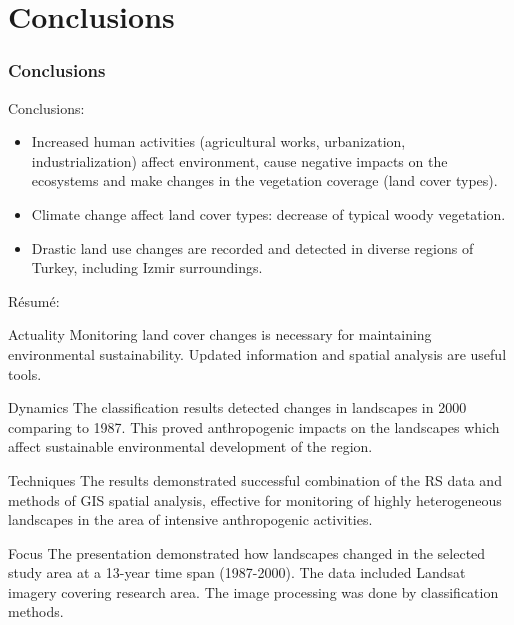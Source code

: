 \documentclass[pdflatex,compress,8pt,
	xcolor={dvipsnames,dvipsnames,svgnames,x11names,table},
	hyperref={colorlinks = true,
	breaklinks = true, 
	urlcolor = NavyBlue, 
	breaklinks = true}]{beamer}
\begin{document}
\section{Conclusions}
\begin{frame}\frametitle{Conclusions}
Conclusions: 
\begin{itemize}
	\item Increased human activities (agricultural works, urbanization, industrialization) affect environment, cause negative impacts on the ecosystems and make changes in the vegetation coverage (land cover types).
	\item Climate change affect land cover types: decrease of typical woody vegetation.
	\item Drastic land use changes are recorded and detected in diverse regions of Turkey, including Izmir surroundings.
\end{itemize}

R\'{e}sum\'{e}:

\begin{alertblock}{Actuality}
Monitoring land cover changes is necessary for maintaining environmental sustainability. Updated information and spatial analysis are useful tools.
\end{alertblock}

\begin{block}{Dynamics}
The classification results detected changes in landscapes in 2000 comparing to 1987. This proved anthropogenic impacts on the landscapes which affect sustainable environmental development of the region.
\end{block}

\begin{block}{Techniques}
The results demonstrated successful combination of the RS data and methods of GIS spatial analysis, effective for monitoring of highly heterogeneous landscapes in the area of intensive anthropogenic activities.
\end{block}

\begin{examples}{Focus}
The presentation demonstrated how landscapes changed in the selected study area at a 13-year time span (1987-2000). The data included Landsat imagery covering research area. The image processing was done by classification methods.
\end{examples}

\end{frame}
\end{document}
